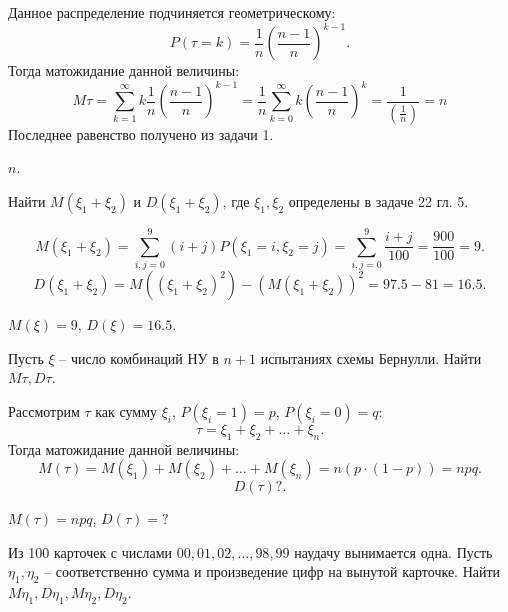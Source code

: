 \begin{solution}
Данное распределение подчиняется геометрическому: \[
P(\tau = k) = \frac{1}{n} \left(\frac{n - 1}{n}\right)^{k - 1}
.\] Тогда матожидание данной величины: \[
M\tau = \sum_{k = 1}^{\infty} k \frac{1}{n} \left(\frac{n - 1}{n}\right)^{k - 1}  = \frac{1}{n}
\sum_{k = 0}^{\infty} k \left(\frac{n - 1}{n}\right)^{k} = \frac{1}{\left(\frac{1}{n}\right)} = n
\] Последнее равенство получено из задачи 1.
\end{solution}

\begin{result}
$n$.
\end{result}
\medskip
\begin{task}{6}
  Найти $M\left(\xi_1 + \xi_2\right)$ и $D\left(\xi_1 + \xi_2\right)$, где $\xi_1, \xi_2$ определены
  в задаче 22 гл. 5.
\end{task}

\begin{solution}
\[
M(\xi_1 + \xi_2) = \sum_{i, j = 0}^{9} \left(i + j\right) P(\xi_1 = i, \xi_2 = j) = \sum_{i, j =
0}^{9}\frac{i + j}{100} = \frac{900}{100} = 9
.\] 
\[
D(\xi_1 + \xi_2) = M(\left(\xi_1 + \xi_2\right)^{2}) - \left(M(\xi_1 + \xi_2)\right)^{2} = 97.5 - 81
= 16.5
.\] 
\end{solution}

\begin{result}
$M(\xi) = 9$, $D(\xi) = 16.5$.
\end{result}
\medskip
\begin{task}{7}
  Пусть $\xi$ --  число комбинаций НУ в $n + 1$ испытаниях схемы Бернулли. Найти $M\tau, D\tau$.
\end{task}

\begin{solution}
  Рассмотрим $\tau$ как сумму $\xi_i$, $P(\xi_i = 1) = p$, $P(\xi_i = 0) = q$: \[
\tau = \xi_1 + \xi_2 + \dots + \xi_n
.\] 
Тогда матожидание данной величины: \[
M(\tau) = M(\xi_1) + M(\xi_2) + \dots + M(\xi_n) = n(p \cdot (1 - p)) = npq
.\] 
\[
D(\tau) ?
.\] 
\end{solution}

\begin{result}
$M(\tau) = npq$, $D(\tau) = ?$
\end{result}

\medskip
\begin{task}{8}
  Из 100 карточек с числами $00, 01, 02, \dots, 98, 99$ наудачу вынимается одна. Пусть $\eta_1, \eta_2$ 
  -- соответственно сумма и произведение цифр на вынутой карточке. Найти $M\eta_1, D\eta_1, M\eta_2, D\eta_2$.
\end{task}


